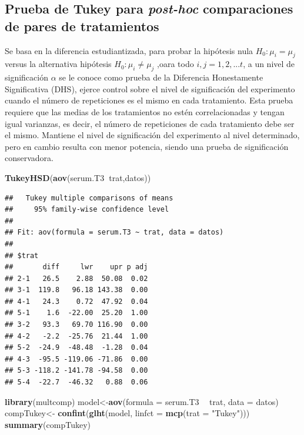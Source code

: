 \documentclass[]{book}
\newenvironment{Shaded}{\begin{snugshade}}{\end{snugshade}}
\newcommand{\KeywordTok}[1]{\textcolor[rgb]{0.13,0.29,0.53}{\textbf{#1}}}
\newcommand{\DataTypeTok}[1]{\textcolor[rgb]{0.13,0.29,0.53}{#1}}
\newcommand{\StringTok}[1]{\textcolor[rgb]{0.31,0.60,0.02}{#1}}
\newcommand{\OperatorTok}[1]{\textcolor[rgb]{0.81,0.36,0.00}{\textbf{#1}}}
\newcommand{\NormalTok}[1]{#1}
\begin{document}
\subsection{\texorpdfstring{Prueba de Tukey para \emph{post-hoc}
comparaciones de pares de
tratamientos}{Prueba de Tukey para post-hoc comparaciones de pares de tratamientos}}\label{prueba-de-tukey-para-post-hoc-comparaciones-de-pares-de-tratamientos}

Se basa en la diferencia estudiantizada, para probar la hipótesis nula
\(H_0:\mu_i=\mu_j\) versus la alternativa hipótesis
\(H_0:\mu_i\neq\mu_j\) ,oara todo \(i,j=1,2,...t\), a un nivel de
significación \(\alpha\) se le conoce como prueba de la Diferencia
Honestamente Significativa (DHS), ejerce control sobre el nivel de
significación del experimento cuando el número de repeticiones es el
mismo en cada tratamiento. Esta prueba requiere que las medias de los
tratamientos no estén correlacionadas y tengan igual varianzas, es
decir, el número de repeticiones de cada tratamiento debe ser el mismo.
Mantiene el nivel de significación del experimento al nivel determinado,
pero en cambio resulta con menor potencia, siendo una prueba de
significación conservadora.

\begin{Shaded}
\begin{Highlighting}[]
\KeywordTok{TukeyHSD}\NormalTok{(}\KeywordTok{aov}\NormalTok{(serum.T3}\OperatorTok{~}\NormalTok{trat,datos))}
\end{Highlighting}
\end{Shaded}

\begin{verbatim}
##   Tukey multiple comparisons of means
##     95% family-wise confidence level
## 
## Fit: aov(formula = serum.T3 ~ trat, data = datos)
## 
## $trat
##       diff     lwr    upr p adj
## 2-1   26.5    2.88  50.08  0.02
## 3-1  119.8   96.18 143.38  0.00
## 4-1   24.3    0.72  47.92  0.04
## 5-1    1.6  -22.00  25.20  1.00
## 3-2   93.3   69.70 116.90  0.00
## 4-2   -2.2  -25.76  21.44  1.00
## 5-2  -24.9  -48.48  -1.28  0.04
## 4-3  -95.5 -119.06 -71.86  0.00
## 5-3 -118.2 -141.78 -94.58  0.00
## 5-4  -22.7  -46.32   0.88  0.06
\end{verbatim}

\begin{Shaded}
\begin{Highlighting}[]
\KeywordTok{library}\NormalTok{(multcomp)}
\NormalTok{model<-}\KeywordTok{aov}\NormalTok{(}\DataTypeTok{formula =}\NormalTok{ serum.T3 }\OperatorTok{~}\StringTok{ }\NormalTok{trat, }\DataTypeTok{data =}\NormalTok{ datos)}
\NormalTok{compTukey<-}\StringTok{ }\KeywordTok{confint}\NormalTok{(}\KeywordTok{glht}\NormalTok{(model, }\DataTypeTok{linfct =} \KeywordTok{mcp}\NormalTok{(}\DataTypeTok{trat =} \StringTok{"Tukey"}\NormalTok{)))}
\KeywordTok{summary}\NormalTok{(compTukey)}
\end{Highlighting}
\end{Shaded}
\end{document}

